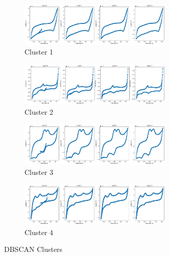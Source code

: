 \begin{figure}[!h]
  \centering
  	\begin{subfigure}{1.0\textwidth}
  	\centering
    \includegraphics[width=0.8\textwidth]{figures/dbscan_results.png}
    \caption{Cluster 1}
    \end{subfigure}
    
    \begin{subfigure}{1.0\textwidth}
    \centering
    \includegraphics[width=0.8\textwidth]{figures/dbscan_results1.png}
    \caption{Cluster 2}
    \end{subfigure}
    
    \begin{subfigure}{1.0\textwidth}
    \centering
    \includegraphics[width=0.8\textwidth]{figures/dbscan_results2.png}
    \caption{Cluster 3}
    \end{subfigure}
    
    \begin{subfigure}{1.0\textwidth}
    \centering
    \includegraphics[width=0.8\textwidth]{figures/dbscan_results3.png}
    \caption{Cluster 4}
    \end{subfigure}
    
    \caption{DBSCAN Clusters}
    \label{dbscan_results}
\end{figure}
